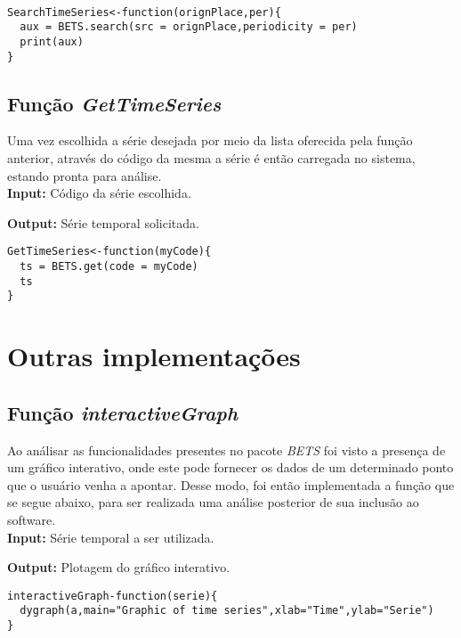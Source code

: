 \documentclass[12pt,letterpaper]{article}
\begin{document}
\begin{lstlisting}

SearchTimeSeries<-function(orignPlace,per){
  aux = BETS.search(src = orignPlace,periodicity = per)
  print(aux)
}

\end{lstlisting}

\subsection{Função \textit{GetTimeSeries}}

Uma vez escolhida a série desejada por meio da lista oferecida pela função anterior, através do código da mesma a série é então carregada no sistema, estando pronta para análise.\\

\textbf{Input: } Código da série escolhida.

\textbf{Output: } Série temporal solicitada.\\ 

\begin{lstlisting}
GetTimeSeries<-function(myCode){
  ts = BETS.get(code = myCode)
  ts
}
\end{lstlisting}


\section{Outras implementações}

\subsection{Função \textit{interactiveGraph}}

Ao análisar as funcionalidades presentes no pacote \textit{BETS} foi visto a presença de um gráfico interativo, onde este pode fornecer os dados de um determinado ponto que o usuário venha a  apontar. Desse modo, foi então implementada a função que se segue abaixo, para ser realizada uma análise posterior de sua inclusão ao software.\\

\textbf{Input: }Série temporal a ser utilizada.

\textbf{Output: } Plotagem do gráfico interativo.\\

\begin{lstlisting}
interactiveGraph-function(serie){
  dygraph(a,main="Graphic of time series",xlab="Time",ylab="Serie")
}
\end{lstlisting}
\end{document}
